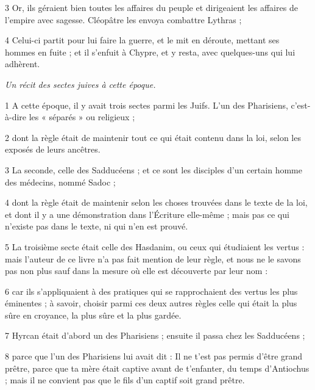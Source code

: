 \par 3 Or, ils géraient bien toutes les affaires du peuple et dirigeaient les affaires de l'empire avec sagesse. Cléopâtre les envoya combattre Lythras ;

\par 4 Celui-ci partit pour lui faire la guerre, et le mit en déroute, mettant ses hommes en fuite ; et il s'enfuit à Chypre, et y resta, avec quelques-uns qui lui adhèrent.


\par \textit{Un récit des sectes juives à cette époque.}

\par 1 A cette époque, il y avait trois sectes parmi les Juifs. L'un des Pharisiens, c'est-à-dire les « séparés » ou religieux ;

\par 2 dont la règle était de maintenir tout ce qui était contenu dans la loi, selon les exposés de leurs ancêtres.

\par 3 La seconde, celle des Sadducéens ; et ce sont les disciples d'un certain homme des médecins, nommé Sadoc ;

\par 4 dont la règle était de maintenir selon les choses trouvées dans le texte de la loi, et dont il y a une démonstration dans l'Écriture elle-même ; mais pas ce qui n'existe pas dans le texte, ni qui n'en est prouvé.

\par 5 La troisième secte était celle des Hasdanim, ou ceux qui étudiaient les vertus : mais l'auteur de ce livre n'a pas fait mention de leur règle, et nous ne le savons pas non plus sauf dans la mesure où elle est découverte par leur nom :

\par 6 car ils s'appliquaient à des pratiques qui se rapprochaient des vertus les plus éminentes ; à savoir, choisir parmi ces deux autres règles celle qui était la plus sûre en croyance, la plus sûre et la plus gardée.

\par 7 Hyrcan était d'abord un des Pharisiens ; ensuite il passa chez les Sadducéens ;

\par 8 parce que l'un des Pharisiens lui avait dit : Il ne t'est pas permis d'être grand prêtre, parce que ta mère était captive avant de t'enfanter, du temps d'Antiochus ; mais il ne convient pas que le fils d'un captif soit grand prêtre.

